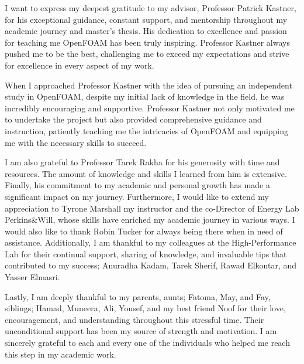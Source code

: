 
\begin{acknowledgments}

I want to express my deepest gratitude to my advisor, Professor Patrick Kastner, for his exceptional guidance, constant support, and mentorship throughout my academic journey and master's thesis. His dedication to excellence and passion for teaching me OpenFOAM has been truly inspiring. Professor Kastner always pushed me to be the best, challenging me to exceed my expectations and strive for excellence in every aspect of my work. 

When I approached Professor Kastner with the idea of pursuing an independent study in OpenFOAM, despite my initial lack of knowledge in the field, he was incredibly encouraging and supportive. Professor Kastner not only motivated me to undertake the project but also provided comprehensive guidance and instruction, patiently teaching me the intricacies of OpenFOAM and equipping me with the necessary skills to succeed.

I am also grateful to Professor Tarek Rakha for his generosity with time and resources. The amount of knowledge and skills I learned from him is extensive. Finally, his commitment to my academic and personal growth has made a significant impact on my journey. Furthermore, I would like to extend my appreciation to Tyrone Marshall my instructor and the co-Director of Energy Lab Perkins\&Will, whose skills have enriched my academic journey in various ways. I would also like to thank Robin Tucker for always being there when in need of assistance. Additionally, I am thankful to my colleagues at the High-Performance Lab for their continual support, sharing of knowledge, and invaluable tips that contributed to my success; Anuradha Kadam, Tarek Sherif, Rawad Elkontar, and Yasser Elmasri.

Lastly, I am deeply thankful to my parents, aunts; Fatoma, May, and Fay, siblings; Hamad, Muneera, Ali, Yousef, and my best friend Noof for their love, encouragement, and understanding throughout this stressful time. Their unconditional support has been my source of strength and motivation.
I am sincerely grateful to each and every one of the individuals who helped me reach this step in my academic work.

\end{acknowledgments}
